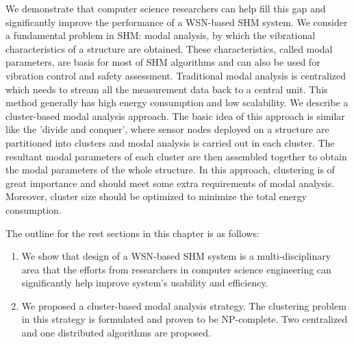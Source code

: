 We demonstrate that computer science researchers can help fill this gap and significantly improve the performance of a WSN-based SHM system. We consider a fundamental problem in SHM: modal analysis, by which the vibrational characteristics of a structure are obtained.  These characteristics, called modal parameters, are basis for most of SHM algorithms and can also be used for vibration control and safety assessment. Traditional modal analysis is centralized which needs to stream all the measurement data back to a central unit. This method generally has high energy consumption and low scalability. We describe a cluster-based modal analysis approach. The basic idea of this approach is similar like the 'divide and conquer', where sensor nodes deployed on a structure are partitioned into clusters and modal analysis is carried out in each cluster. The resultant modal parameters of each cluster are then assembled together to obtain the modal parameters of the whole structure. In this approach, clustering is of great importance and should meet some extra requirements of modal analysis. Moreover, cluster size should be optimized to minimize the total energy consumption.

The outline for the rest sections in this chapter is as follows:
\begin{enumerate}
\item	We show that design of a WSN-based SHM system is a multi-disciplinary area that the efforts from researchers in computer science engineering can significantly help improve system's usability and efficiency. 
\item We proposed a cluster-based modal analysis strategy. The clustering problem in this strategy is formulated and proven to be NP-complete.  Two centralized and one distributed algorithms are proposed.
\end{enumerate}
